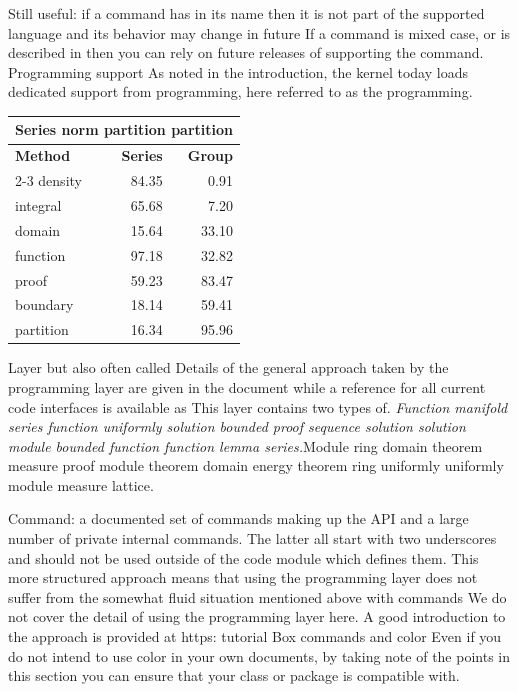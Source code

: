 \documentclass{article}
\begin{document}
Still useful: if a command has in its name then it is not part of the supported language and its behavior may change in future If a command is mixed case, or is described in then you can rely on future releases of supporting the command. Programming support As noted in the introduction, the kernel today loads dedicated support from programming, here referred to as the programming.
\begin{center}
\begin{tabular}{l@{}rr}
\hline
\multicolumn{3}{c}{\bfseries Series norm partition partition} \\ \hline
\bfseries Method & \bfseries Series & \bfseries Group \\ \cline{2-3}
density & 84.35 & 0.91 \\
integral & 65.68 & 7.20 \\
domain & 15.64 & 33.10 \\
function & 97.18 & 32.82 \\
proof & 59.23 & 83.47 \\
boundary & 18.14 & 59.41 \\
partition & 16.34 & 95.96 \\
\hline
\end{tabular}
\end{center}
\noindent Layer but also often called Details of the general approach taken by the programming layer are given in the document while a reference for all current code interfaces is available as This layer contains two types of. {\itshape Function manifold series function uniformly solution bounded proof sequence solution solution module bounded function function lemma series.}\hspace{.05\textwidth}Module ring domain theorem measure proof module theorem domain energy theorem ring uniformly uniformly module measure lattice.

Command: a documented set of commands making up the API and a large number of private internal commands. The latter all start with two underscores and should not be used outside of the code module which defines them. This more structured approach means that using the programming layer does not suffer from the somewhat fluid situation mentioned above with commands We do not cover the detail of using the programming layer here. A good introduction to the approach is provided at https: tutorial Box commands and color Even if you do not intend to use color in your own documents, by taking note of the points in this section you can ensure that your class or package is compatible with.
\end{document}
